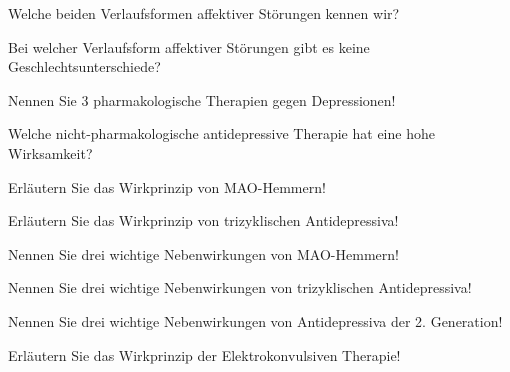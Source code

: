 \documentclass[10pt, a4paper]{exam}
\begin{document}
\begin{questions}
\begin{solution}
  \end{solution}

  \question Welche beiden Verlaufsformen affektiver Störungen kennen wir?
  \begin{solution}

  \end{solution}

  \question Bei welcher Verlaufsform affektiver Störungen gibt es keine Geschlechtsunterschiede?
  \begin{solution}

  \end{solution}

  \question Nennen Sie 3 pharmakologische Therapien gegen Depressionen!
  \begin{solution}

  \end{solution}

  \question Welche nicht-pharmakologische antidepressive Therapie hat eine hohe Wirksamkeit?
  \begin{solution}

  \end{solution}

  \question Erläutern Sie das Wirkprinzip von MAO-Hemmern!
  \begin{solution}

  \end{solution}

  \question Erläutern Sie das Wirkprinzip von trizyklischen Antidepressiva!
  \begin{solution}

  \end{solution}

  \question Nennen Sie drei wichtige Nebenwirkungen von MAO-Hemmern!
  \begin{solution}

  \end{solution}

  \question Nennen Sie drei wichtige Nebenwirkungen von trizyklischen Antidepressiva!
  \begin{solution}

  \end{solution}

  \question Nennen Sie drei wichtige Nebenwirkungen von Antidepressiva der 2.  Generation!
  \begin{solution}

  \end{solution}

  \question Erläutern Sie das Wirkprinzip der Elektrokonvulsiven Therapie!
  \begin{solution}


\end{solution}
\end{questions}
\end{document}
